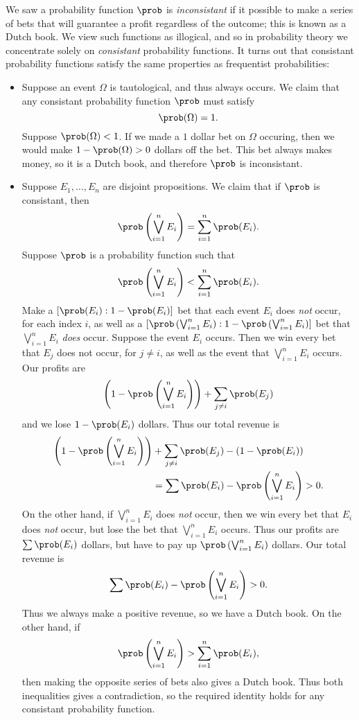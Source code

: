 We saw a probability function $\prob$ is \emph{inconsistant} if it possible to make a series of bets that will guarantee a profit regardless of the outcome; this is known as a Dutch book. We view such functions as illogical, and so in probability theory we concentrate solely on \emph{consistant} probability functions. It turns out that consistant probability functions satisfy the same properties as frequentist probabilities:
%
\begin{itemize}
    \item Suppose an event $\Omega$ is tautological, and thus always occurs. We claim that any consistant probability function $\prob$ must satisfy
    \[ \prob(\Omega) = 1. \]
    Suppose $\prob(\Omega) < 1$. If we made a $1$ dollar bet on $\Omega$ occuring, then we would make $1 - \prob(\Omega) > 0$ dollars off the bet. This bet always makes money, so it is a Dutch book, and therefore $\prob$ is inconsistant.

    \item Suppose $E_1, \dots, E_n$ are disjoint propositions. We claim that if $\prob$ is consistant, then
    \[ \prob \left( \bigvee_{i = 1}^n E_i \right) = \sum_{i = 1}^n \prob(E_i). \]
    Suppose $\prob$ is a probability function such that
    \[ \prob \left( \bigvee_{i = 1}^n E_i \right) < \sum_{i = 1}^n \prob(E_i). \]
    Make a $[\prob(E_i): 1 - \prob(E_i)]$ bet that each event $E_i$ does {\it not} occur, for each index $i$, as well as a $[\prob \left( \bigvee_{i = 1}^n E_i \right) : 1 - \prob \left( \bigvee_{i = 1}^n E_i \right)]$ bet that $\bigvee_{i = 1}^n E_i$ {\it does} occur. Suppose the event $E_i$ occurs. Then we win every bet that $E_j$ does not occur, for $j \neq i$, as well as the event that $\bigvee_{i = 1}^n E_i$ occurs. Our profits are
    \[ \left( 1 - \prob \left( \bigvee_{i = 1}^n E_i \right) \right) + \sum_{j \neq i} \prob(E_j) \]
    and we lose $1 - \prob(E_i)$ dollars. Thus our total revenue is
    \begin{align*}
        \left( 1 - \prob \left( \bigvee_{i = 1}^n E_i \right) \right)& + \sum_{j \neq i} \prob(E_j) - \left( 1 - \prob(E_i) \right)\\
        &= \sum \prob(E_i) - \prob \left( \bigvee_{i = 1}^n E_i \right) > 0.
    \end{align*}
    On the other hand, if $\bigvee_{i = 1}^n E_i$ does {\it not} occur, then we win every bet that $E_i$ does {\it not} occur, but lose the bet that $\bigvee_{i = 1}^n E_i$ occurs. Thus our profits are $\sum \prob(E_i)$ dollars, but have to pay up $\prob \left( \bigvee_{i = 1}^n E_i \right)$ dollars. Our total revenue is
    \[ \sum \prob(E_i) - \prob \left( \bigvee_{i = 1}^n E_i \right) > 0. \]
    Thus we always make a positive revenue, so we have a Dutch book. On the other hand, if
    \[ \prob \left( \bigvee_{i = 1}^n E_i \right) > \sum_{i = 1}^n \prob(E_i), \]
    then making the opposite series of bets also gives a Dutch book. Thus both inequalities gives a contradiction, so the required identity holds for any consistant probability function.
\end{itemize}

